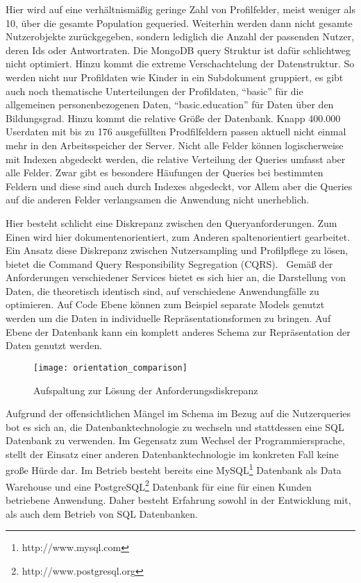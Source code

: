Hier wird auf eine verhältnismäßig geringe Zahl von Profilfelder, meist weniger als 10, über die gesamte Population gequeried. Weiterhin werden dann nicht gesamte Nutzerobjekte zurückgegeben, sondern lediglich die Anzahl der passenden Nutzer, deren Ids oder Antwortraten. Die MongoDB query Struktur ist dafür schlichtweg nicht optimiert. Hinzu kommt die extreme Verschachtelung der Datenstruktur. So werden nicht nur Profildaten wie Kinder in ein Subdokument gruppiert, es gibt auch noch thematische Unterteilungen der Profildaten, ``basic'' für die allgemeinen personenbezogenen Daten, ``basic.education'' für Daten über den Bildungsgrad.
Hinzu kommt die relative Größe der Datenbank. Knapp 400.000 Userdaten mit bis zu 176 ausgefüllten Prodfilfeldern passen aktuell nicht einmal mehr in den Arbeitsspeicher der Server. Nicht alle Felder können logischerweise mit Indexen abgedeckt werden, die relative Verteilung der Queries umfasst aber alle Felder. Zwar gibt es besondere Häufungen der Queries bei bestimmten Feldern und diese sind auch durch Indexes abgedeckt, vor Allem aber die Queries auf die anderen Felder verlangsamen die Anwendung nicht unerheblich.

Hier besteht schlicht eine Diskrepanz zwischen den Queryanforderungen. Zum Einen wird hier dokumentenorientiert, zum Anderen spaltenorientiert gearbeitet. %
Ein Ansatz diese Diskrepanz zwischen Nutzersampling und Profilpflege zu lösen, bietet die Command Query Responsibility Segregation (CQRS).~\cite[][]{fowler:cqrs} Gemäß der Anforderungen verschiedener Services bietet es sich hier an, die Darstellung von Daten, die theoretisch identisch sind, auf verschiedene Anwendungfälle zu optimieren. Auf Code Ebene können zum Beispiel separate Models genutzt werden um die Daten in individuelle Repräsentationsformen zu bringen. Auf Ebene der Datenbank kann ein komplett anderes Schema zur Repräsentation der Daten genutzt werden.

\begin{figure}[!ht]
    \centering
    \caption{Aufspaltung zur Lösung der Anforderungsdiskrepanz}
    \label{fig:orientationsplit}
    \texttt{[image: orientation\_comparison]}
\end{figure}

Aufgrund der offensichtlichen Mängel im Schema im Bezug auf die Nutzerqueries bot es sich an, die Datenbanktechnologie zu wechseln und stattdessen eine SQL Datenbank zu verwenden. Im Gegensatz zum Wechsel der Programmiersprache, stellt der Einsatz einer anderen Datenbanktechnologie im konkreten Fall keine große Hürde dar. Im Betrieb besteht bereits eine MySQL\footnote{http://www.mysql.com} Datenbank als Data Warehouse und eine PostgreSQL\footnote{http://www.postgresql.org} Datenbank für eine für einen Kunden betriebene Anwendung. Daher besteht Erfahrung sowohl in der Entwicklung mit, als auch dem Betrieb von SQL Datenbanken.

